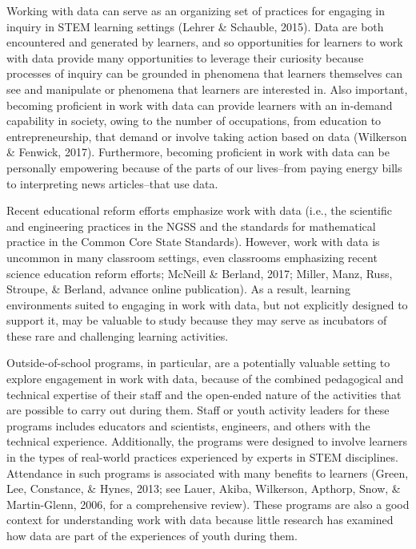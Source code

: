 \documentclass[]{book}
\theoremstyle{definition}
\theoremstyle{definition}
\theoremstyle{definition}
\theoremstyle{remark}
\begin{document}
Working with data can serve as an organizing set of practices for
engaging in inquiry in STEM learning settings (Lehrer \& Schauble,
2015). Data are both encountered and generated by learners, and so
opportunities for learners to work with data provide many opportunities
to leverage their curiosity because processes of inquiry can be grounded
in phenomena that learners themselves can see and manipulate or
phenomena that learners are interested in. Also important, becoming
proficient in work with data can provide learners with an in-demand
capability in society, owing to the number of occupations, from
education to entrepreneurship, that demand or involve taking action
based on data (Wilkerson \& Fenwick, 2017). Furthermore, becoming
proficient in work with data can be personally empowering because of the
parts of our lives--from paying energy bills to interpreting news
articles--that use data.

Recent educational reform efforts emphasize work with data (i.e., the
scientific and engineering practices in the NGSS and the standards for
mathematical practice in the Common Core State Standards). However, work
with data is uncommon in many classroom settings, even classrooms
emphasizing recent science education reform efforts; McNeill \& Berland,
2017; Miller, Manz, Russ, Stroupe, \& Berland, advance online
publication). As a result, learning environments suited to engaging in
work with data, but not explicitly designed to support it, may be
valuable to study because they may serve as incubators of these rare and
challenging learning activities.

Outside-of-school programs, in particular, are a potentially valuable
setting to explore engagement in work with data, because of the combined
pedagogical and technical expertise of their staff and the open-ended
nature of the activities that are possible to carry out during them.
Staff or youth activity leaders for these programs includes educators
and scientists, engineers, and others with the technical experience.
Additionally, the programs were designed to involve learners in the
types of real-world practices experienced by experts in STEM
disciplines. Attendance in such programs is associated with many
benefits to learners (Green, Lee, Constance, \& Hynes, 2013; see Lauer,
Akiba, Wilkerson, Apthorp, Snow, \& Martin-Glenn, 2006, for a
comprehensive review). These programs are also a good context for
understanding work with data because little research has examined how
data are part of the experiences of youth during them.
\end{document}
